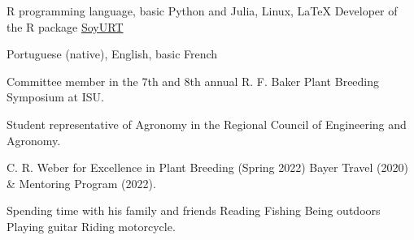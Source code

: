 \documentclass[]{mdkrause_cv_openfont}
\begin{document}
\begin{minipage}[t]{1\textwidth}
\sectionsep

R programming language, basic Python and Julia, Linux, \LaTeX \hspace{1 mm} \textbullet{} Developer of the R package \href{https://cran.r-project.org/web/packages/SoyURT/index.html}{SoyURT} \ExternalLink

\sectionsep

Portuguese (native), English, basic French

\sectionsep

\begin{tightemize}
	\item {} Committee member in the 7th and 8th annual R. F. Baker Plant Breeding Symposium at ISU.
	\item {} Student representative of Agronomy in the Regional Council of Engineering and Agronomy.
\end{tightemize}

\sectionsep

C. R. Weber for Excellence in Plant Breeding (Spring 2022) \textbullet{} Bayer Travel (2020) \& Mentoring Program (2022). \\

\sectionsep

Spending time with his family and friends \textbullet{} Reading \textbullet{} Fishing \textbullet{} Being outdoors \textbullet{} Playing guitar \textbullet{} Riding motorcycle. \\

\sectionsep
{}

\sectionsep
\sectionsep



\end{minipage}
\end{document}
